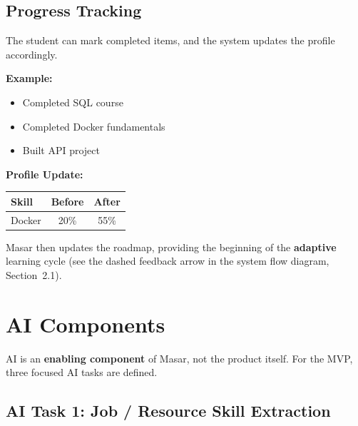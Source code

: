 \documentclass[12pt,a4paper]{article}
\newcommand{\strongmark}{\textcolor{masargreen}{\ding{51}}}
\begin{document}
\subsection{Progress Tracking}
\label{sec:mvp-progress}

The student can mark completed items, and the system updates the profile accordingly.

\bigskip
\noindent\textbf{Example:}
\begin{itemize}[leftmargin=1.5cm]
  \item[\strongmark] Completed SQL course
  \item[\strongmark] Completed Docker fundamentals
  \item[\strongmark] Built API project
\end{itemize}

\noindent\textbf{Profile Update:}
\begin{center}
\begin{tabular}{@{} l c c @{}}
\toprule
\textbf{Skill} & \textbf{Before} & \textbf{After} \\
\midrule
Docker & 20\% & 55\% \\
\bottomrule
\end{tabular}
\end{center}

\noindent Masar then updates the roadmap, providing the beginning of the \textbf{adaptive} learning cycle (see the dashed feedback arrow in the system flow diagram, Section~2.1).

\newpage

\section{AI Components}

AI is an \textbf{enabling component} of Masar, not the product itself. For the MVP, three focused AI tasks are defined.

\subsection{AI Task 1: Job / Resource Skill Extraction}
\label{sec:ai-extraction}
\end{document}
